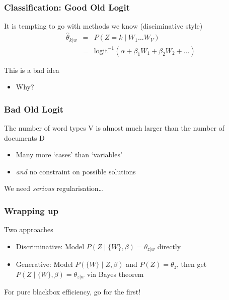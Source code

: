 \documentclass[11pt,compress,professionalfonts]{beamer}
\newcommand{\ita}{\begin{itemize}}
\newcommand{\itm}{\item[]}
\newcommand{\itz}{\end{itemize}}
\begin{document}
%
\begin{frame}[t,fragile]\frametitle{Classification: Good Old Logit}

It is tempting to go with methods we know (disciminative style)
\begin{eqnarray*}
\hat{\theta}_{k|w} &=& P(Z=k \mid W_1 \ldots W_V)\\
&=& \text{logit}^{-1}(\alpha + \beta_1 W_1 + \beta_2 W_2 + \ldots)
\end{eqnarray*}

This is a bad idea
\ita
\itm Why?
\itz

\end{frame}
\begin{frame}[t,fragile]\frametitle{Bad Old Logit}

The number of word types V is almost much larger than the number of documents D
\ita
\itm Many more `cases' than `variables'
\itm \textit{and} no constraint on possible solutions
\itz

We need \textit{serious} regularisation\ldots

\end{frame}
\begin{frame}[t,fragile]\frametitle{Wrapping up}



Two approaches
\ita
\itm Discriminative: Model $P(Z \mid \{W\}, \beta) = \theta_{z|w}$ directly
\itm Generative: Model $P(\{W\} \mid Z, \beta)$ and $P(Z)=\theta_z$, then get $P(Z \mid \{W\}, \beta) = \theta_{z|w}$ via Bayes theorem
\itz
For pure blackbox efficiency, go for the first!
\end{frame}
\end{document}
